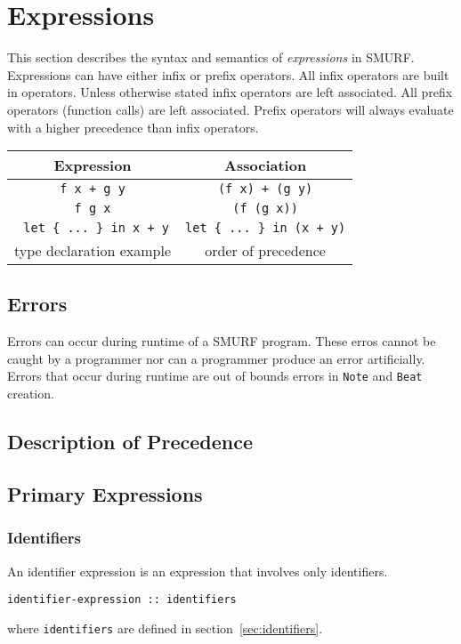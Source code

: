 \section{Expressions}

This section describes the syntax and semantics of \emph{expressions} in 
SMURF. Expressions can have either infix or prefix operators. All 
infix operators are built in operators. Unless otherwise stated infix 
operators are left associated. All prefix operators (function calls) 
are left associated. Prefix operators will always evaluate with a 
higher precedence than infix operators.  


\begin{center}
	\begin{tabular}{|c|c|}
		\hline
		Expression & Association \\
		\hline
		\texttt{f x + g y} & \texttt{(f x) + (g y)} \\
		\texttt{f g x} & \texttt{(f (g x))} \\
		\texttt{ let \{ ... \} in x + y} & \texttt{let \{ ... \} in (x + y)} \\
		type declaration example & order of precedence \\
		\hline
	\end{tabular}
\end{center}


\subsection{Errors}

Errors can occur during runtime of a SMURF program. These erros cannot be 
caught by a programmer nor can a programmer produce an error artificially. 
Errors that occur during runtime are out of bounds errors in \texttt{Note} 
and \texttt{Beat} creation.

\subsection{Description of Precedence}


\subsection{Primary Expressions}

\subsubsection{Identifiers}
An identifier expression is an expression that involves only identifiers. 
\begin{verbatim}
identifier-expression :: identifiers
\end{verbatim}
where \texttt{identifiers} are defined in section~\ref{sec:identifiers}.


